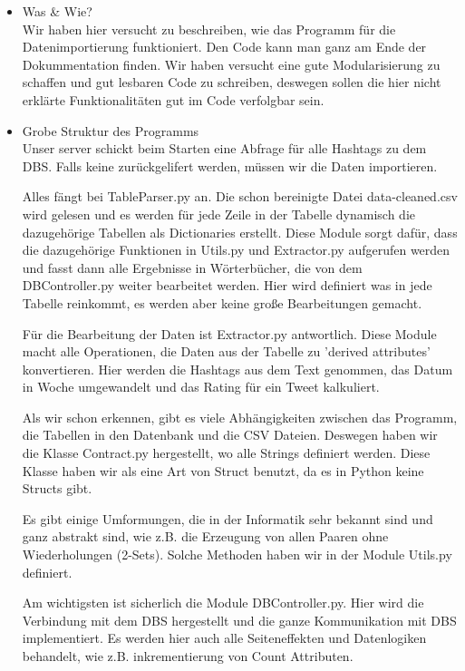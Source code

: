 \begin{itemize}

\item Was \& Wie? \\

Wir haben hier versucht zu beschreiben, wie das Programm für die Datenimportierung funktioniert. Den Code kann man ganz am Ende der Dokummentation finden. Wir haben versucht eine gute Modularisierung zu schaffen und gut lesbaren Code zu schreiben, deswegen sollen die hier nicht erklärte Funktionalitäten gut im Code verfolgbar sein.

\item Grobe Struktur des Programms \\

Unser server schickt beim Starten eine Abfrage für alle Hashtags zu dem DBS. Falls keine zurückgelifert werden, müssen wir die Daten importieren.

Alles fängt bei TableParser.py an. Die schon bereinigte Datei data-cleaned.csv wird gelesen und es werden für jede Zeile in der Tabelle dynamisch die dazugehörige Tabellen als Dictionaries erstellt. Diese Module sorgt dafür, dass die dazugehörige Funktionen in Utils.py und Extractor.py aufgerufen werden und fasst dann alle Ergebnisse in Wörterbücher, die von dem DBController.py weiter bearbeitet werden. Hier wird definiert was in jede Tabelle reinkommt, es werden aber keine große Bearbeitungen gemacht.

Für die Bearbeitung der Daten ist Extractor.py antwortlich. Diese Module macht alle Operationen, die Daten aus der Tabelle zu 'derived attributes' konvertieren. Hier werden die Hashtags aus dem Text genommen, das Datum in Woche umgewandelt und das Rating für ein Tweet kalkuliert.

Als wir schon erkennen, gibt es viele Abhängigkeiten zwischen das Programm, die Tabellen in den Datenbank und die CSV Dateien. Deswegen haben wir die Klasse Contract.py hergestellt, wo alle Strings definiert werden. Diese Klasse haben wir als eine Art von Struct benutzt, da es in Python keine Structs gibt.

Es gibt einige Umformungen, die in der Informatik sehr bekannt sind und ganz abstrakt sind, wie z.B. die Erzeugung von allen Paaren ohne Wiederholungen (2-Sets). Solche Methoden haben wir in der Module Utils.py definiert.

Am wichtigsten ist sicherlich die Module DBController.py. Hier wird die Verbindung mit dem DBS hergestellt und die ganze Kommunikation mit DBS implementiert. Es werden hier auch alle Seiteneffekten und Datenlogiken behandelt, wie z.B. inkrementierung von Count Attributen. 


\end{itemize}
